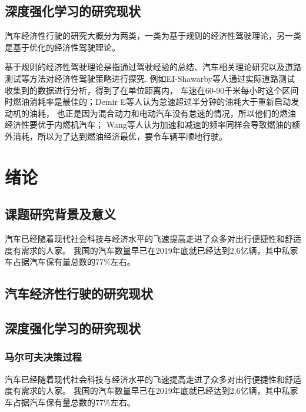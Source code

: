 \section{深度强化学习的研究现状}
\par  汽车经济性行驶的研究大概分为两类，一类为基于规则的经济性驾驶理论，另一类是基于优化的经济性驾驶理论。
\par  基于规则的经济性驾驶理论是指通过驾驶经验的总结、汽车相关理论研究以及道路测试等方法对经济性驾驶策略进行探究.
例如EI-Shawarby等人通过实际道路测试收集到的数据进行分析，得到了在单位距离内，
车速在60-90千米每小时这个区间时燃油消耗率是最佳的；Demir E等人认为怠速超过半分钟的油耗大于重新启动发动机的油耗，
也正是因为混合动力和电动汽车没有怠速的情况，所以他们的燃油经济性要优于内燃机汽车；
Wang等人认为加速和减速的频率同样会导致燃油的额外消耗，所以为了达到燃油经济最优，要令车辆平顺地行驶。

\chapter{绪论}
\section{课题研究背景及意义}
汽车已经随着现代社会科技与经济水平的飞速提高走进了众多对出行便捷性和舒适度有需求的人家。
我国的汽车数量早已在2019年底就已经达到2.6亿辆，其中私家车占据汽车保有量总数的77\%左右。
\section{汽车经济性行驶的研究现状}
\section{深度强化学习的研究现状}
\subsection{马尔可夫决策过程}
汽车已经随着现代社会科技与经济水平的飞速提高走进了众多对出行便捷性和舒适度有需求的人家。
我国的汽车数量早已在2019年底就已经达到2.6亿辆，其中私家车占据汽车保有量总数的77\%左右。